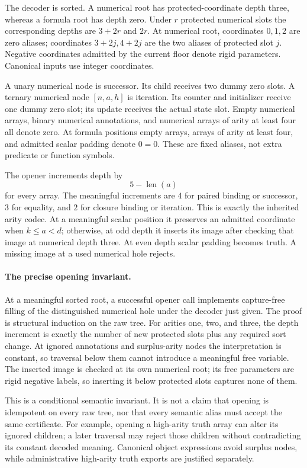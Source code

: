 The decoder is sorted.  A numerical root has protected-coordinate depth
three, whereas a formula root has depth zero.  Under $r$ protected
numerical slots the corresponding depths are $3+2r$ and $2r$.
At numerical root, coordinates $0,1,2$ are zero aliases; coordinates
$3+2j,4+2j$ are the two aliases of protected slot $j$.  Negative
coordinates admitted by the current floor denote rigid parameters.
Canonical inputs use integer coordinates.

A unary numerical node is successor.  Its child receives two dummy
zero slots.  A ternary numerical node $[n,a,h]$ is iteration.  Its
counter and initializer receive one dummy zero slot; its update
receives the actual state slot.  Empty numerical arrays, binary
numerical annotations, and numerical arrays of arity at least four
all denote zero.  At formula positions empty arrays, arrays of arity
at least four, and admitted scalar padding denote $0=0$.
These are fixed aliases, not extra predicate or function symbols.

The opener increments depth by
\[
                       5-\operatorname{len}(a)
\]
for every array.  The meaningful increments are $4$ for paired
binding or successor, $3$ for equality, and $2$ for closure binding
or iteration.  This is exactly the inherited arity codec.
At a meaningful scalar position it preserves an admitted coordinate
when $k\leq a<d$; otherwise, at odd depth it inserts its image after
checking that image at numerical depth three.  At even depth scalar
padding becomes truth.  A missing image at a used numerical hole
rejects.

\paragraph{The precise opening invariant.}
At a meaningful sorted root, a successful opener call implements
capture-free filling of the distinguished numerical hole under the
decoder just given.  The proof is structural induction on the raw tree.
For arities one, two, and three, the depth increment is exactly the
number of new protected slots plus any required sort change.  At
ignored annotations and surplus-arity nodes the interpretation is
constant, so traversal below them cannot introduce a meaningful free
variable.  The inserted image is checked at its own numerical root;
its free parameters are rigid negative labels, so inserting it below
protected slots captures none of them.

This is a conditional semantic invariant.  It is not a claim that
opening is idempotent on every raw tree, nor that every semantic alias
must accept the same certificate.  For example, opening a high-arity
truth array can alter its ignored children; a later traversal may
reject those children without contradicting its constant decoded
meaning.  Canonical object expressions avoid surplus nodes, while
administrative high-arity truth exports are justified separately.

